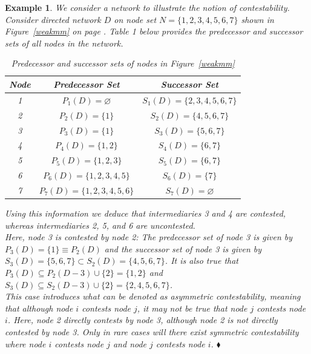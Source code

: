 \documentclass[11pt,fleqn]{article}
\newtheorem{expl}[theorem]{Example}
\newenvironment{example}{\begin{expl} \rm}{\hfill $\blacklozenge$ \end{expl}}{}
\begin{document}
\begin{example} \label{Simple Contestability}
We consider a network to illustrate the notion of contestability. Consider directed network $D$ on node set $N = \{1,2,3,4,5,6,7\}$ shown in Figure~\ref{weakmm} on page \pageref{weakmm}. Table 1 below provides the predecessor and successor sets of all nodes in the network.

\begin{table}[h]
\begin{center}
\begin{tabular}{|c|cc|}
\toprule
Node & Predecessor Set  & Successor Set                     \\
\midrule
1    & $P_{1}(D)=\varnothing$          & $S_{1}(D)=\{2,3,4,5,6,7\}$        \\
2    & $P_{2}(D)=\{1\}$                & $S_{2}(D)=\{4,5,6,7\}$            \\
3    & $P_{3}(D)=\{1\}$                & $S_{3}(D)=\{5,6,7\}$              \\
4    & $P_{4}(D)=\{1,2\}$              & $S_{4}(D)=\{6,7\}$                \\
5    & $P_{5}(D)=\{1,2,3\}$            & $S_{5}(D)=\{6,7\}$                \\
6    & $P_{6}(D)=\{1,2,3,4,5\}$        & $S_{6}(D)=\{7\}$                  \\
7    & $P_{7}(D)=\{1,2,3,4,5,6\}$      & $S_{7}(D)=\varnothing$  \\
\bottomrule
\end{tabular}

\caption{Predecessor and successor sets of nodes in Figure~\ref{weakmm}}
\label{network1stats}
\end{center}
\end{table}

\noindent
Using this information we deduce that intermediaries 3 and 4 are contested, whereas intermediaries 2, 5, and 6 are uncontested.
\\
Here, node 3 is contested by node 2: The predecessor set of node 3 is given by $P_{3}(D) = \{1\} \equiv P_{2}(D)$ and the successor set of node 3 is given by $S_{3}(D) = \{5,6,7\} \subset S_{2}(D) = \{4,5,6,7\}$. It is also true that $P_{3}(D) \subseteq P_{2}(D - 3) \cup \{2\} = \{ 1,2 \}$ and $S_{3}(D) \subseteq S_{2}(D - 3) \cup \{2\} = \{ 2,4,5,6,7 \}$.
\\
This case introduces what can be denoted as \textit{asymmetric contestability}, meaning that although node $i$ contests node $j$, it may not be true that node $j$ contests node $i$. Here, node 2 directly contests by node 3, although node 2 is not directly contested by node 3. Only in rare cases will there exist \textit{symmetric contestability} where node $i$ contests node $j$ and node $j$ contests node $i$.
\end{example}
\end{document}
